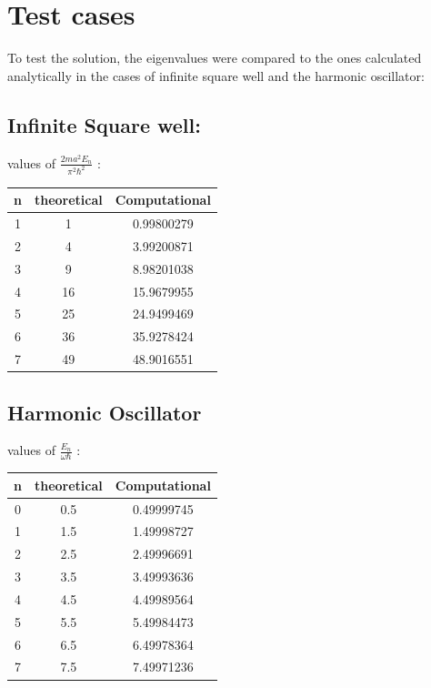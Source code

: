 \documentclass[10pt, a4paper]{article}
\begin{document}
\section{{\large\textbf{Test cases}}}
\begin{adjustwidth}{1cm}{}
To test the solution, the eigenvalues were compared to the ones calculated analytically in the cases of infinite square well and the harmonic oscillator:
\newpage
\subsection{Infinite Square well:}
values of $\frac{2ma^2E_n}{\pi^2\hbar^2}$ :\\
\begin{table}[H]
    \centering
    \begin{tabular}{|c|c|c|}\hline
    n& theoretical& Computational\\ \hline
    1& 1          & 0.99800279    \\ \hline
    2& 4          & 3.99200871     \\ \hline
    3& 9          & 8.98201038      \\ \hline
    4& 16         & 15.9679955       \\ \hline
    5& 25         & 24.9499469        \\ \hline
    6& 36         & 35.9278424         \\ \hline
    7& 49         & 48.9016551          \\ \hline
\end{tabular}
    \label{tab:test1}
\end{table}

\subsection{Harmonic Oscillator}
values of $\frac{E_n}{\omega\hbar}$ :
\begin{table}[H]
    \centering
    \begin{tabular}{|c|c|c|}\hline
    n& theoretical& Computational\\ \hline
    0& 0.5 &0.49999745            \\ \hline
    1& 1.5& 1.49998727             \\ \hline
    2& 2.5& 2.49996691              \\ \hline
    3& 3.5& 3.49993636               \\ \hline
    4& 4.5& 4.49989564                \\ \hline
    5& 5.5& 5.49984473                 \\ \hline
    6& 6.5& 6.49978364                  \\ \hline
    7& 7.5& 7.49971236                   \\ \hline
    \end{tabular}
    
    \label{tab:test2}
\end{table}
\end{adjustwidth} 
\end{document}
